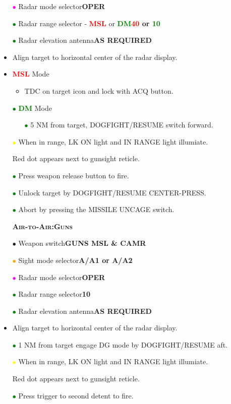 \documentclass[a4paper,12pt,dvipsnames]{letter}
\newcommand{\button}[1]{\textbf{#1}}
\newcommand{\ok}[1]{\textcolor{Green}{\textbf{#1}}}
\newcommand{\warn}[1]{\textcolor{Red}{\textbf{#1}}}
\newcommand{\myHead}[1]{{\LARGE\textsc{\textbf{#1}}}}
\newcommand{\bi}{\textcolor{ProcessBlue}{$\bullet$\;}}
\newcommand{\gi}{\textcolor{Green}{$\bullet$\;}}
\newcommand{\yi}{\textcolor{Yellow}{$\bullet$\;}}
\newcommand{\mi}{\textcolor{Magenta}{$\bullet$\;}}
\newcommand{\oi}{\textcolor{Orange}{$\bullet$\;}}
\begin{document}
{\begin{itemize}
 \item[\mi] Radar mode selector\dotfill\button{OPER}
 \item[\gi] Radar range selector - \warn{MSL} or \ok{DM}\dotfill\button{\warn{40} or \ok{10}}
 \item[\gi] Radar elevation antenna\dotfill\button{AS REQUIRED}
 \item Align target to horizontal center of the radar display.
 \item \warn{MSL} Mode
 \begin{itemize}
 \item TDC on target icon and lock with ACQ button.
  \end{itemize}
  \item[\gi] \ok{DM} Mode
 \begin{itemize}
 \item[\gi] 5 NM from target, DOGFIGHT/RESUME switch forward.
  \end{itemize}
 \item[\yi] When in range, LK ON light and IN RANGE light illumiate.
 \item[] Red dot appears next to gunsight reticle.
 \item[\gi] Press weapon release button to fire.
 \item[\gi] Unlock target by DOGFIGHT/RESUME CENTER-PRESS.
 \item[\gi] Abort by pressing the MISSILE UNCAGE switch.
\end{itemize}
\vspace{0.5em}
\begin{itemize}
 \item[] \myHead{Air-to-Air:\;Guns}
 \item[\bi] Weapon switch\dotfill\button{GUNS MSL \& CAMR}
 \item[\oi] Sight mode selector\dotfill\button{A/A1 or A/A2}
 \item[\mi] Radar mode selector\dotfill\button{OPER}
 \item[\gi] Radar range selector\dotfill\button{10}
 \item[\gi] Radar elevation antenna\dotfill\button{AS REQUIRED}
 \item Align target to horizontal center of the radar display.
 \item[\gi] 1 NM from target engage DG mode by DOGFIGHT/RESUME aft.
 \item[\yi] When in range, LK ON light and IN RANGE light illumiate.
 \item[] Red dot appears next to gunsight reticle.
 \item[\gi] Press trigger to second detent to fire.
\end{itemize}
}
\end{document}
